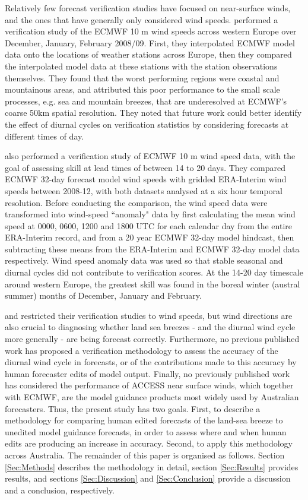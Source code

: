 \documentclass{ametsoc}
\begin{document}
Relatively few forecast verification studies have focused on near-surface winds, and the ones that have generally only considered wind speeds. \citet{pinson12} performed a verification study of the ECMWF 10 m wind speeds across western Europe over December, January, February 2008/09. First, they interpolated ECMWF model data onto the locations of weather stations across Europe, then they compared the interpolated model data at these stations with the station observations themselves. They found that the worst performing regions were coastal and mountainous areas, and attributed this poor performance to the small scale processes, e.g. sea and mountain breezes, that are underesolved at ECMWF's coarse 50km spatial resolution. They noted that future work could better identify the effect of diurnal cycles on verification statistics by considering forecasts at different times of day. 

\citet{lynch14} also performed a verification study of ECMWF 10 m wind speed data, with the goal of assessing skill at lead times of between 14 to 20 days. They compared ECMWF 32-day forecast model wind speeds with gridded ERA-Interim wind speeds between 2008-12, with both datasets analysed at a six hour temporal resolution. Before conducting the comparison, the wind speed data were transformed into wind-speed ``anomaly" data by first calculating the mean wind speed at 0000, 0600, 1200 and 1800 UTC for each calendar day from the entire ERA-Interim record, and from a 20 year ECMWF 32-day model hindcast, then subtracting these means from the ERA-Interim and ECMWF 32-day model data respectively. Wind speed anomaly data was used so that stable seasonal and diurnal cycles did not contribute to verification scores. At the 14-20 day timescale around western Europe, the greatest skill was found in the boreal winter (austral summer) months of December, January and February.  

\citet{pinson12} and \citet{lynch14} restricted their verification studies to wind speeds, but wind directions are also crucial to diagnosing whether land sea breezes - and the diurnal wind cycle more generally - are being forecast correctly. Furthermore, no previous published work has proposed a verification methodology to assess the accuracy of the diurnal wind cycle in forecasts, or of the contributions made to this accuracy by human forecaster edits of model output. Finally, no previously published work has considered the performance of ACCESS near surface winds, which together with ECMWF, are the model guidance products most widely used by Australian forecasters. Thus, the present study has two goals. First, to describe a methodology for comparing human edited forecasts of the land-sea breeze to unedited model guidance forecasts, in order to assess where and when human edits are producing an increase in accuracy. Second, to apply this methodology across Australia. The remainder of this paper is organised as follows. Section \ref{Sec:Methods} describes the methodology in detail, section \ref{Sec:Results} provides results, and sections \ref{Sec:Discussion} and \ref{Sec:Conclusion} provide a discussion and a conclusion, respectively.     
\end{document}
